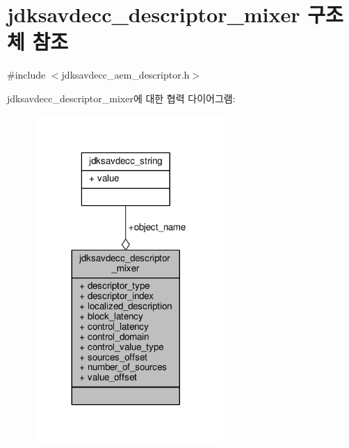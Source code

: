 \hypertarget{structjdksavdecc__descriptor__mixer}{}\section{jdksavdecc\+\_\+descriptor\+\_\+mixer 구조체 참조}
\label{structjdksavdecc__descriptor__mixer}


{\ttfamily \#include $<$jdksavdecc\+\_\+aem\+\_\+descriptor.\+h$>$}



jdksavdecc\+\_\+descriptor\+\_\+mixer에 대한 협력 다이어그램\+:
\nopagebreak
\begin{figure}[H]
\begin{center}
\leavevmode
\includegraphics[width=203pt]{structjdksavdecc__descriptor__mixer__coll__graph}
\end{center}
\end{figure}
